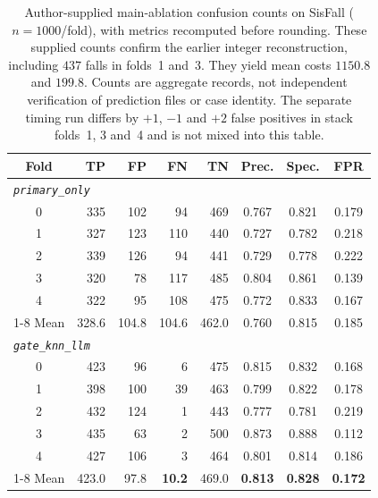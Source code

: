 \begin{table}[!t]
\centering
\caption{Author-supplied main-ablation confusion counts on SisFall ($n{=}1000$/fold), with metrics recomputed before rounding. These supplied counts confirm the earlier integer reconstruction, including $437$ falls in folds~1 and~3. They yield mean costs $1150.8$ and $199.8$. Counts are aggregate records, not independent verification of prediction files or case identity. The separate timing run differs by $+1$, $-1$ and $+2$ false positives in stack folds~1, 3 and~4 and is not mixed into this table.}
\label{tab:confusion}
\begin{tabular}{c rrrr ccc}
\toprule
Fold & TP & FP & FN & TN & Prec. & Spec. & FPR \\
\midrule
\multicolumn{8}{l}{\textit{\texttt{primary\_only}}} \\
0 & 335 & 102 & 94  & 469 & 0.767 & 0.821 & 0.179 \\
1 & 327 & 123 & 110 & 440 & 0.727 & 0.782 & 0.218 \\
2 & 339 & 126 & 94  & 441 & 0.729 & 0.778 & 0.222 \\
3 & 320 & 78  & 117 & 485 & 0.804 & 0.861 & 0.139 \\
4 & 322 & 95  & 108 & 475 & 0.772 & 0.833 & 0.167 \\
\cmidrule(lr){1-8}
Mean & 328.6 & 104.8 & 104.6 & 462.0 & 0.760 & 0.815 & 0.185 \\
\midrule
\multicolumn{8}{l}{\textit{\texttt{gate\_knn\_llm}}} \\
0 & 423 & 96  & 6  & 475 & 0.815 & 0.832 & 0.168 \\
1 & 398 & 100 & 39 & 463 & 0.799 & 0.822 & 0.178 \\
2 & 432 & 124 & 1  & 443 & 0.777 & 0.781 & 0.219 \\
3 & 435 & 63  & 2  & 500 & 0.873 & 0.888 & 0.112 \\
4 & 427 & 106 & 3  & 464 & 0.801 & 0.814 & 0.186 \\
\cmidrule(lr){1-8}
Mean & 423.0 & 97.8 & \textbf{10.2} & 469.0 & \textbf{0.813} & \textbf{0.828} & \textbf{0.172} \\
\bottomrule
\end{tabular}
\end{table}
